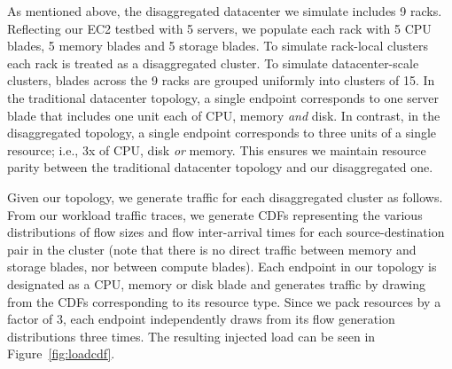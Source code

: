 As mentioned above, the disaggregated datacenter we simulate includes %
9 racks. Reflecting our EC2 testbed with 5 servers, we populate each rack with  5 CPU blades, 5 memory blades and 5 storage blades.
To simulate rack-local clusters each rack is treated as a disaggregated cluster. 
To simulate datacenter-scale clusters, blades across the 9 racks are grouped uniformly into clusters of 15.
In the traditional datacenter topology, a single endpoint corresponds to one server blade that includes one unit each of CPU, memory \emph{and} disk. In contrast, in the disaggregated topology, a single endpoint corresponds to three units of a single resource; i.e., 3x of CPU, disk \emph{or} memory. This ensures we maintain resource parity between the traditional datacenter topology and our disaggregated one.





Given our topology, we generate traffic for each disaggregated cluster as follows. From our workload traffic traces, we generate CDFs representing the various distributions of flow sizes and flow inter-arrival times for each source-destination pair in the cluster (note that there is no direct traffic between memory and storage blades, nor between compute blades).
Each endpoint in our topology is designated as a CPU, memory or disk blade and 
generates traffic by drawing from the CDFs corresponding to its resource type.
Since we pack resources by a factor of 3, each endpoint independently draws from its flow generation distributions three times. 
The resulting injected load can be seen in Figure~\ref{fig:loadcdf}. 

